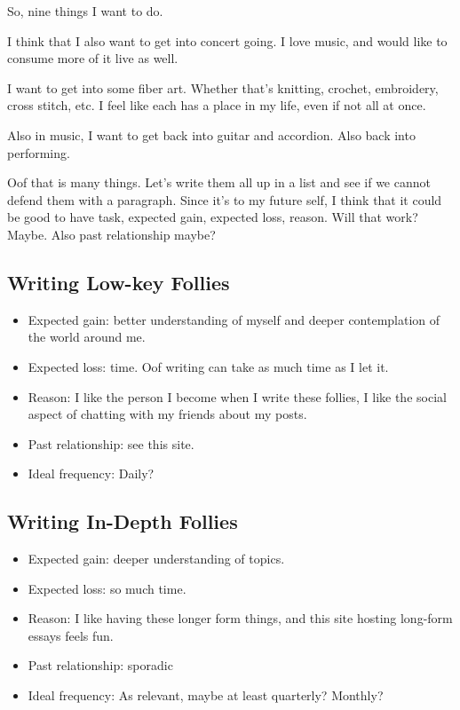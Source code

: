 \documentclass[12pt]{article}
\renewcommand{\,}{\textsuperscript{,}}
\begin{document}
So, nine things I want to do.

I think that I also want to get into concert going.
I love music, and would like to consume more of it live as well.

I want to get into some fiber art.
Whether that's knitting, crochet, embroidery, cross stitch, etc. I feel like each has a place in my life, even if not all at once.

Also in music, I want to get back into guitar and accordion.
Also back into performing.

Oof that is many things.
Let's write them all up in a list and see if we cannot defend them with a paragraph.
Since it's to my future self, I think that it could be good to have task, expected gain, expected loss, reason.
Will that work? Maybe.
Also past relationship maybe?

\subsection{Writing Low-key Follies}
\begin{itemize}
    \item Expected gain: better understanding of myself and deeper contemplation of the world around me.
    \item Expected loss: time. Oof writing can take as much time as I let it.
    \item Reason: I like the person I become when I write these follies, I like the social aspect of chatting with my friends about my posts.
    \item Past relationship: see this site.
    \item Ideal frequency: Daily?
\end{itemize}

\subsection{Writing In-Depth Follies}
\begin{itemize}
    \item Expected gain: deeper understanding of topics.
    \item Expected loss: so much time.
    \item Reason: I like having these longer form things, and this site hosting long-form essays feels fun.
    \item Past relationship: sporadic
    \item Ideal frequency: As relevant, maybe at least quarterly? Monthly?
\end{itemize}
\end{document}
